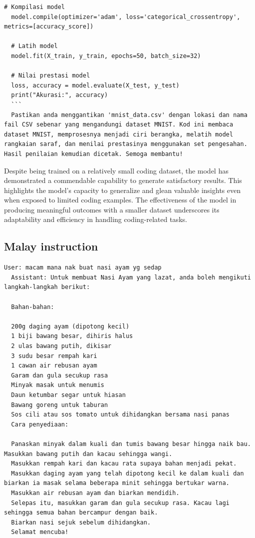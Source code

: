 \documentclass{article}
\begin{document}
\begin{lstlisting}[breaklines=true]
  # Kompilasi model
  model.compile(optimizer='adam', loss='categorical_crossentropy', metrics=[accuracy_score])
  
  # Latih model
  model.fit(X_train, y_train, epochs=50, batch_size=32)
  
  # Nilai prestasi model
  loss, accuracy = model.evaluate(X_test, y_test)
  print("Akurasi:", accuracy)
  ```
  Pastikan anda menggantikan 'mnist_data.csv' dengan lokasi dan nama fail CSV sebenar yang mengandungi dataset MNIST. Kod ini membaca dataset MNIST, memprosesnya menjadi ciri berangka, melatih model rangkaian saraf, dan menilai prestasinya menggunakan set pengesahan. Hasil penilaian kemudian dicetak. Semoga membantu!
\end{lstlisting}

Despite being trained on a relatively small coding dataset, the model has demonstrated a commendable capability to generate satisfactory results. This highlights the model's capacity to generalize and glean valuable insights even when exposed to limited coding examples. The effectiveness of the model in producing meaningful outcomes with a smaller dataset underscores its adaptability and efficiency in handling coding-related tasks.

\subsection{Malay instruction}

\begin{lstlisting}[breaklines=true]
  User: macam mana nak buat nasi ayam yg sedap
  Assistant: Untuk membuat Nasi Ayam yang lazat, anda boleh mengikuti langkah-langkah berikut:

  Bahan-bahan:
  
  200g daging ayam (dipotong kecil)
  1 biji bawang besar, dihiris halus
  2 ulas bawang putih, dikisar
  3 sudu besar rempah kari
  1 cawan air rebusan ayam
  Garam dan gula secukup rasa
  Minyak masak untuk menumis
  Daun ketumbar segar untuk hiasan
  Bawang goreng untuk taburan
  Sos cili atau sos tomato untuk dihidangkan bersama nasi panas
  Cara penyediaan:
  
  Panaskan minyak dalam kuali dan tumis bawang besar hingga naik bau. Masukkan bawang putih dan kacau sehingga wangi.
  Masukkan rempah kari dan kacau rata supaya bahan menjadi pekat.
  Masukkan daging ayam yang telah dipotong kecil ke dalam kuali dan biarkan ia masak selama beberapa minit sehingga bertukar warna.
  Masukkan air rebusan ayam dan biarkan mendidih.
  Selepas itu, masukkan garam dan gula secukup rasa. Kacau lagi sehingga semua bahan bercampur dengan baik.
  Biarkan nasi sejuk sebelum dihidangkan.
  Selamat mencuba!
\end{lstlisting}
\end{document}
